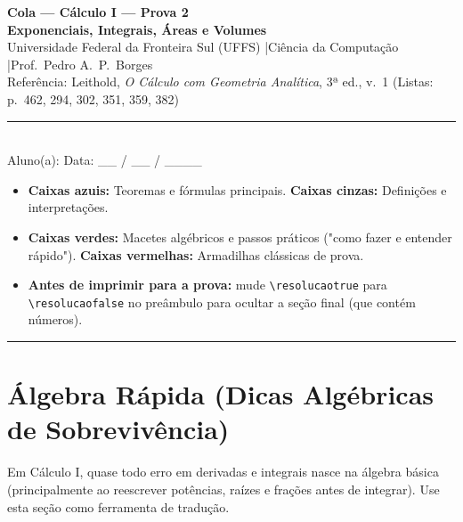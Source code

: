 \documentclass[10pt,a4paper]{article}
\newif\ifresolucao
\begin{document}
\begin{center}
    {\Large\bfseries Cola --- Cálculo I --- Prova 2}\\[2pt]
    {\large\bfseries Exponenciais, Integrais, Áreas e Volumes}\\[4pt]
    {\small Universidade Federal da Fronteira Sul (UFFS) \quad|\quad Ciência da Computação \quad|\quad Prof.\ Pedro A.\ P.\ Borges}\\[2pt]
    {\small Referência: Leithold, \textit{O Cálculo com Geometria Analítica}, 3ª ed., v.\ 1 (Listas: p.\ 462, 294, 302, 351, 359, 382)}\\[6pt]
    \rule{\linewidth}{0.6pt}\\[4pt]
    Aluno(a): \underline{\hspace{9cm}} \hfill Data: \_\_ / \_\_ / \_\_\_\_
\end{center}

\begin{dica}
    \begin{itemize}
        \item \textbf{Caixas azuis:} Teoremas e fórmulas principais. \textbf{Caixas cinzas:} Definições e interpretações.
        \item \textbf{Caixas verdes:} Macetes algébricos e passos práticos ("como fazer e entender rápido"). \textbf{Caixas vermelhas:} Armadilhas clássicas de prova.
        \item \textbf{Antes de imprimir para a prova:} mude \verb|\resolucaotrue| para \verb|\resolucaofalse| no preâmbulo para ocultar a seção final (que contém números).
    \end{itemize}
\end{dica}

{\small
\tableofcontents
}
\vspace{4pt}
\hrule

\section{Álgebra Rápida (Dicas Algébricas de Sobrevivência)}

Em Cálculo I, quase todo erro em derivadas e integrais nasce na álgebra básica (principalmente ao reescrever potências, raízes e frações antes de integrar). Use esta seção como ferramenta de tradução.
\end{document}
